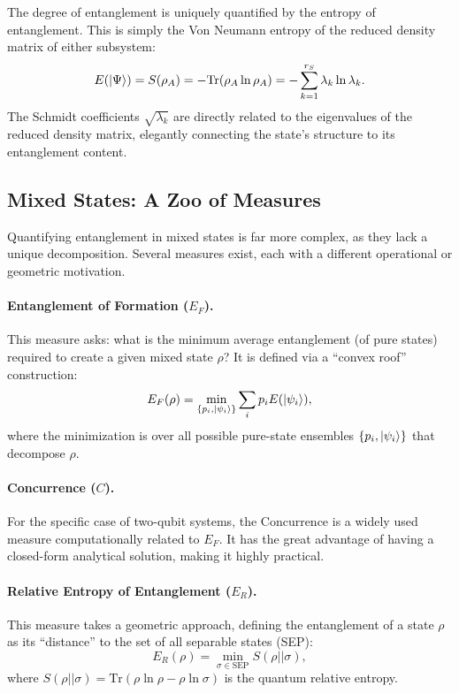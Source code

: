 The degree of entanglement is uniquely quantified by the
entropy of entanglement. This is simply the Von Neumann entropy of
the reduced density matrix of either subsystem:
\begin{equation}
	E(\ket{\Psi}) = S(\rho_A) = -\mathrm{Tr}(\rho_A \ln \rho_A) = -\sum_{k=1}^{r_S} \lambda_k \ln \lambda_k.
\end{equation}
The Schmidt coefficients $\sqrt{\lambda_k}$ are directly related to the
eigenvalues of the reduced density matrix, elegantly connecting the
state's structure to its entanglement content.

\subsection{Mixed States: A Zoo of Measures}
\label{sub:mixed_state_measures}
Quantifying entanglement in mixed states is far more complex, as they lack
a unique decomposition. Several measures exist, each with a different
operational or geometric motivation.

\paragraph{Entanglement of Formation (\texorpdfstring{$E_F$}{E\_F}).}
This measure asks: what is the minimum average entanglement (of pure states)
required to create a given mixed state $\rho$? It is defined via a
``convex roof'' construction:
\begin{equation}
	E_F(\rho) = \min_{\{p_i, \ket{\psi_i}\}} \sum_i p_i E(\ket{\psi_i}),
\end{equation}
where the minimization is over all possible pure-state ensembles
$\{p_i, \ket{\psi_i}\}$ that decompose $\rho$.

\paragraph{Concurrence (\texorpdfstring{$C$}{C}).}
For the specific case of two-qubit systems, the Concurrence is a widely
used measure computationally related to $E_F$. It has the great advantage
of having a closed-form analytical solution, making it highly practical.

\paragraph{Relative Entropy of Entanglement (\texorpdfstring{$E_R$}{E\_R}).}
This measure takes a geometric approach, defining the entanglement of a
state $\rho$ as its ``distance'' to the set of all separable states (SEP):
\begin{equation}
	E_R(\rho) = \min_{\sigma \in \text{SEP}} S(\rho || \sigma),
\end{equation}
where $S(\rho || \sigma) = \mathrm{Tr}(\rho \ln \rho - \rho \ln \sigma)$ is
the quantum relative entropy.

